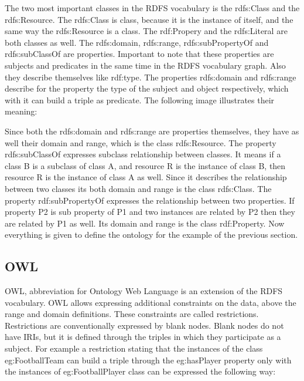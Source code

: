 The two most important classes in the RDFS vocabulary is the rdfs:Class and the rdfs:Resource. The rdfs:Class is class, because it is the instance of itself, and the same way the rdfs:Resource is a class. The rdf:Propery and the rdfs:Literal are both classes as well. The rdfs:domain, rdfs:range, rdfs:subPropertyOf and rdfs:subClassOf are properties. Important to note that these properties are subjects and predicates in the same time in the RDFS vocabulary graph. Also they describe themselves like rdf:type.
The properties rdfs:domain and rdfs:range describe for the property the type of the subject and object respectively, which with it can build a triple as predicate. The following image illustrates their meaning:


Since both the rdfs:domain and rdfs:range are properties themselves, they have as well their domain and range, which is the class rdfs:Resource. 
The property rdfs:subClassOf expresses subclass relationship between classes. It means if a class B is a subclass of class A, and resource R is the instance of class B, then resource R is the instance of class A as well. Since it describes the relationship between two classes its both domain and range is the class rdfs:Class. 
The property rdf:subPropertyOf expresses the relationship between two properties. If property P2 is sub property of P1 and two instances are related by P2 then they are related by P1 as well. Its domain and range is the class  rdf:Property.
Now everything is given to define the ontology for the example of the previous section.



\subsection{OWL}

OWL, abbreviation for Ontology Web Language is an extension of the RDFS vocabulary. OWL allows expressing additional constraints on the data, above the range and domain definitions. These constraints are called restrictions. Restrictions are conventionally expressed by blank nodes. Blank nodes do not have IRIs, but it is defined through the triples in which they participate as a subject. For example a restriction stating that the instances of the class eg:FootballTeam can build a triple through the eg:hasPlayer property only with the instances of eg:FootballPlayer class can be expressed the following way:

